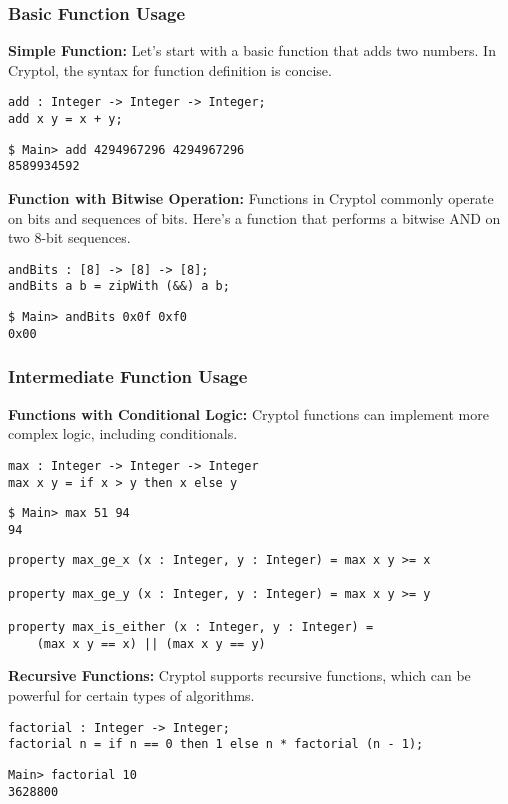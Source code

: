 \subsubsection{Basic Function Usage}
\textbf{Simple Function:} Let's start with a basic function that adds two numbers. In Cryptol, the syntax for function definition is concise.
\begin{lstlisting}[style=cryptol]
add : Integer -> Integer -> Integer;
add x y = x + y;
\end{lstlisting}
\begin{lstlisting}[style=zsh]
$ Main> add 4294967296 4294967296
8589934592
\end{lstlisting}
\vspace{16pt}
\textbf{Function with Bitwise Operation:} Functions in Cryptol commonly operate on bits and sequences of bits. Here's a function that performs a bitwise AND on two 8-bit sequences.
\begin{lstlisting}[style=cryptol]
andBits : [8] -> [8] -> [8];
andBits a b = zipWith (&&) a b;
\end{lstlisting}
\begin{lstlisting}[style=zsh]
$ Main> andBits 0x0f 0xf0
0x00
\end{lstlisting}
\vspace{20pt}
\subsubsection{Intermediate Function Usage}
\textbf{Functions with Conditional Logic:} Cryptol functions can implement more complex logic, including conditionals.
\begin{lstlisting}[style=cryptol]
max : Integer -> Integer -> Integer
max x y = if x > y then x else y
\end{lstlisting}
\begin{lstlisting}[style=zsh]
$ Main> max 51 94
94
\end{lstlisting}

\begin{lstlisting}[style=cryptol]
property max_ge_x (x : Integer, y : Integer) = max x y >= x

property max_ge_y (x : Integer, y : Integer) = max x y >= y

property max_is_either (x : Integer, y : Integer) =
	(max x y == x) || (max x y == y)
\end{lstlisting}
\vspace{16pt}
\textbf{Recursive Functions:} Cryptol supports recursive functions, which can be powerful for certain types of algorithms.
\begin{lstlisting}[style=cryptol]
factorial : Integer -> Integer;
factorial n = if n == 0 then 1 else n * factorial (n - 1);
\end{lstlisting}
\begin{lstlisting}[style=zsh]
Main> factorial 10
3628800
\end{lstlisting}

